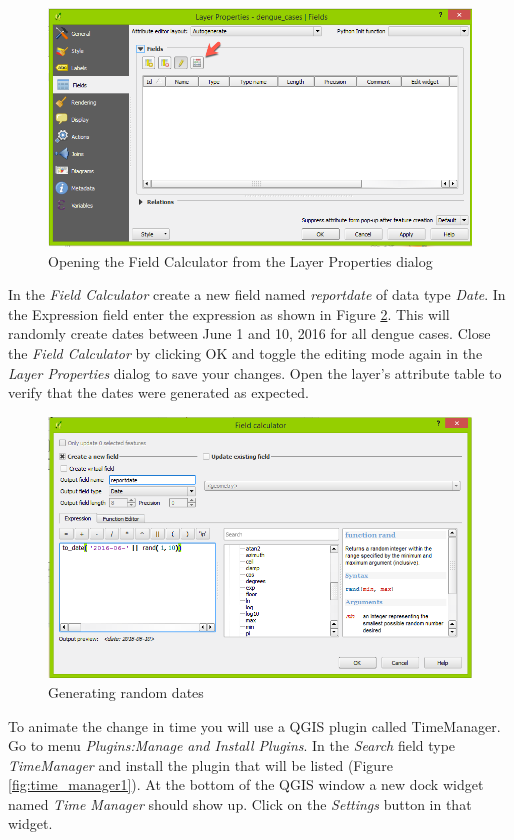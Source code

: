 \documentclass[a4paper,12pt,titlepage]{article}
\begin{document}
\begin{figure}[htb]
	\centering
	\includegraphics[width=12cm]{Images/fields.png}
	\caption{Opening the Field Calculator from the Layer Properties dialog}\label{fig:fields}
\end{figure}

In the \textit{Field Calculator} create a new field named \textit{reportdate} of data type \textit{Date}. In the Expression field enter the expression as shown in Figure \ref{fig:field_calc}. This will randomly create dates between June 1 and 10, 2016 for all dengue cases. Close the \textit{Field Calculator} by clicking OK and toggle the editing mode again in the \textit{Layer Properties} dialog to save your changes. Open the layer's attribute table to verify that the dates were generated as expected.

\begin{figure}[H]
	\centering
	\includegraphics[width=12cm]{Images/field_calc.png}
	\caption{Generating random dates}\label{fig:field_calc}
\end{figure}

To animate the change in time you will use a QGIS plugin called TimeManager. Go to menu \textit{Plugins:Manage and Install Plugins}. In the \textit{Search} field type \textit{TimeManager} and install the plugin that will be listed (Figure \ref{fig:time_manager1}). At the bottom of the QGIS window a new dock widget named \textit{Time Manager} should show up. Click on the \textit{Settings} button in that widget.
\end{document}
